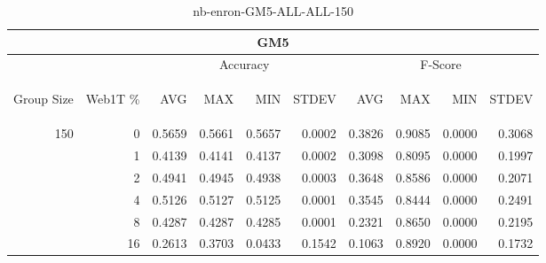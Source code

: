\begin{center}
\begin{table}[htbp]
\begin{tabular}{ | r | r | r | r | r | r | r | r | r | r |}
\hline
\multicolumn{10}{|c|}{GM5}\\
\hline
 & & \multicolumn{4}{|c|}{Accuracy} & \multicolumn{4}{|c|}{F-Score}\\ \cline{3-10}
\begin{sideways}Group Size\end{sideways} & \begin{sideways}Web1T \%\end{sideways} & \begin{sideways}AVG\end{sideways} & \begin{sideways}MAX\end{sideways} & \begin{sideways}MIN\end{sideways} & \begin{sideways}STDEV\end{sideways} & \begin{sideways}AVG\end{sideways} & \begin{sideways}MAX\end{sideways} & \begin{sideways}MIN\end{sideways} & \begin{sideways}STDEV\end{sideways}\\
\hline
\multirow{5}{*}{150}
 & 0 & 0.5659 & 0.5661 & 0.5657 & 0.0002 & 0.3826 & 0.9085 & 0.0000 & 0.3068\\ \cline{2-10}
 & 1 & 0.4139 & 0.4141 & 0.4137 & 0.0002 & 0.3098 & 0.8095 & 0.0000 & 0.1997\\ \cline{2-10}
 & 2 & 0.4941 & 0.4945 & 0.4938 & 0.0003 & 0.3648 & 0.8586 & 0.0000 & 0.2071\\ \cline{2-10}
 & 4 & 0.5126 & 0.5127 & 0.5125 & 0.0001 & 0.3545 & 0.8444 & 0.0000 & 0.2491\\ \cline{2-10}
 & 8 & 0.4287 & 0.4287 & 0.4285 & 0.0001 & 0.2321 & 0.8650 & 0.0000 & 0.2195\\ \cline{2-10}
 & 16 & 0.2613 & 0.3703 & 0.0433 & 0.1542 & 0.1063 & 0.8920 & 0.0000 & 0.1732\\ \cline{2-10}
\hline
\end{tabular}
\caption{nb-enron-GM5-ALL-ALL-150}
\label{table:nb-enron-GM5-ALL-ALL-150}
\end{table}
\end{center}

